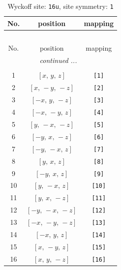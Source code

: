 \documentclass[fleqn,8pt]{jsarticle}
\begin{document}
\begin{longtable}{ccc}
\caption{Wyckoff site: {\tt 16u}, site symmetry: {\tt 1}}
 \\
 \hline \hline
No. & position & mapping \\ \hline \endfirsthead

\multicolumn{2}{l}{\tablename\ \thetable{}} \\
 \hline \hline
No. & position & mapping \\ \hline \endhead

 \hline \hline
\multicolumn{2}{r}{\footnotesize\it continued ...} \\ \endfoot

 \hline \hline
\multicolumn{2}{r}{} \\ \endlastfoot

1 & $\left[ x,\, y,\, z \right]$ & {\tt [1]} \\ \hline
2 & $\left[ x,\, - y,\, - z \right]$ & {\tt [2]} \\ \hline
3 & $\left[ - x,\, y,\, - z \right]$ & {\tt [3]} \\ \hline
4 & $\left[ - x,\, - y,\, z \right]$ & {\tt [4]} \\ \hline
5 & $\left[ y,\, - x,\, - z \right]$ & {\tt [5]} \\ \hline
6 & $\left[ - y,\, x,\, - z \right]$ & {\tt [6]} \\ \hline
7 & $\left[ - y,\, - x,\, z \right]$ & {\tt [7]} \\ \hline
8 & $\left[ y,\, x,\, z \right]$ & {\tt [8]} \\ \hline
9 & $\left[ - y,\, x,\, z \right]$ & {\tt [9]} \\ \hline
10 & $\left[ y,\, - x,\, z \right]$ & {\tt [10]} \\ \hline
11 & $\left[ y,\, x,\, - z \right]$ & {\tt [11]} \\ \hline
12 & $\left[ - y,\, - x,\, - z \right]$ & {\tt [12]} \\ \hline
13 & $\left[ - x,\, - y,\, - z \right]$ & {\tt [13]} \\ \hline
14 & $\left[ - x,\, y,\, z \right]$ & {\tt [14]} \\ \hline
15 & $\left[ x,\, - y,\, z \right]$ & {\tt [15]} \\ \hline
16 & $\left[ x,\, y,\, - z \right]$ & {\tt [16]} \\
\end{longtable}
\end{document}

